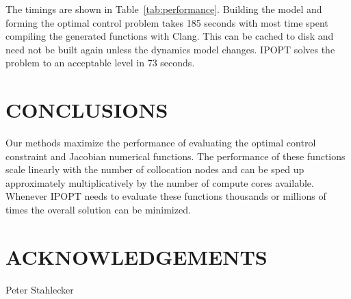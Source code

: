 \documentclass[11pt,twocolumn]{article}
\begin{document}
The timings are shown in Table~\ref{tab:performance}. Building the model and
forming the optimal control problem takes 185 seconds with most time spent
compiling the generated functions with Clang. This can be cached to disk and
need not be built again unless the dynamics model changes. IPOPT solves the
problem to an acceptable level in 73 seconds.

\section*{CONCLUSIONS}
%
Our methods maximize the performance of evaluating the optimal control
constraint and Jacobian numerical functions. The performance of these functions
scale linearly with the number of collocation nodes and can be sped up
approximately multiplicatively by the number of compute cores available.
Whenever IPOPT needs to evaluate these functions thousands or millions of times
the overall solution can be minimized.




\section*{ACKNOWLEDGEMENTS}
Peter Stahlecker
\end{document}
